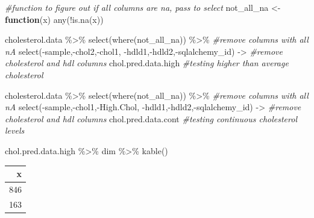 \documentclass[
]{article}
\newenvironment{Shaded}{\begin{snugshade}}{\end{snugshade}}
\newcommand{\CommentTok}[1]{\textcolor[rgb]{0.56,0.35,0.01}{\textit{#1}}}
\newcommand{\ControlFlowTok}[1]{\textcolor[rgb]{0.13,0.29,0.53}{\textbf{#1}}}
\newcommand{\FunctionTok}[1]{\textcolor[rgb]{0.00,0.00,0.00}{#1}}
\newcommand{\NormalTok}[1]{#1}
\newcommand{\OtherTok}[1]{\textcolor[rgb]{0.56,0.35,0.01}{#1}}
\newcommand{\SpecialCharTok}[1]{\textcolor[rgb]{0.00,0.00,0.00}{#1}}
\begin{document}
\begin{Shaded}
\begin{Highlighting}[]
\CommentTok{\#function to figure out if all columns are na, pass to select  }
\NormalTok{not\_all\_na }\OtherTok{\textless{}{-}} \ControlFlowTok{function}\NormalTok{(x) }\FunctionTok{any}\NormalTok{(}\SpecialCharTok{!}\FunctionTok{is.na}\NormalTok{(x))  }

\NormalTok{cholesterol.data }\SpecialCharTok{\%\textgreater{}\%}
  \FunctionTok{select}\NormalTok{(}\FunctionTok{where}\NormalTok{(not\_all\_na)) }\SpecialCharTok{\%\textgreater{}\%} \CommentTok{\#remove columns with all nA}
  \FunctionTok{select}\NormalTok{(}\SpecialCharTok{{-}}\NormalTok{sample,}\SpecialCharTok{{-}}\NormalTok{chol2,}\SpecialCharTok{{-}}\NormalTok{chol1, }\SpecialCharTok{{-}}\NormalTok{hdld1,}\SpecialCharTok{{-}}\NormalTok{hdld2,}\SpecialCharTok{{-}}\NormalTok{sqlalchemy\_id) }\OtherTok{{-}\textgreater{}} \CommentTok{\#remove cholesterol and hdl columns}
\NormalTok{  chol.pred.data.high }\CommentTok{\#testing higher than average cholesterol}

\NormalTok{cholesterol.data }\SpecialCharTok{\%\textgreater{}\%}
  \FunctionTok{select}\NormalTok{(}\FunctionTok{where}\NormalTok{(not\_all\_na)) }\SpecialCharTok{\%\textgreater{}\%} \CommentTok{\#remove columns with all nA}
  \FunctionTok{select}\NormalTok{(}\SpecialCharTok{{-}}\NormalTok{sample,}\SpecialCharTok{{-}}\NormalTok{chol1,}\SpecialCharTok{{-}}\NormalTok{High.Chol, }\SpecialCharTok{{-}}\NormalTok{hdld1,}\SpecialCharTok{{-}}\NormalTok{hdld2,}\SpecialCharTok{{-}}\NormalTok{sqlalchemy\_id) }\OtherTok{{-}\textgreater{}} \CommentTok{\#remove cholesterol and hdl columns}
\NormalTok{  chol.pred.data.cont }\CommentTok{\#testing continuous cholesterol levels}



  
\NormalTok{ chol.pred.data.high }\SpecialCharTok{\%\textgreater{}\%}
\NormalTok{   dim }\SpecialCharTok{\%\textgreater{}\%}
   \FunctionTok{kable}\NormalTok{()}
\end{Highlighting}
\end{Shaded}

\begin{longtable}[]{@{}r@{}}
\toprule()
x \\
\midrule()
\endhead
846 \\
163 \\
\bottomrule()
\end{longtable}
\end{document}
